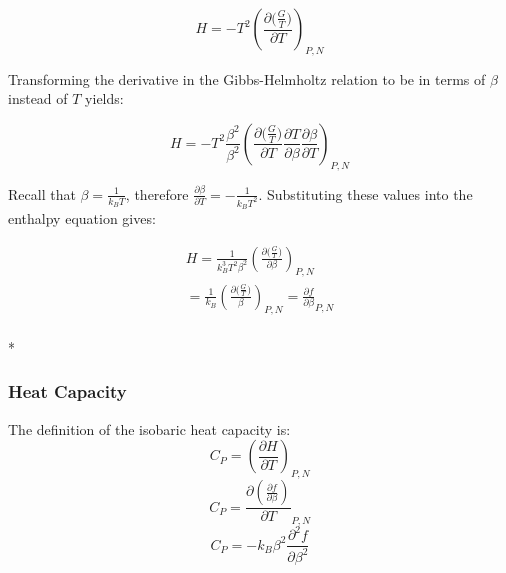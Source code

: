 \documentclass[aps,pre,twocolumn,nofootinbib,superscriptaddress,linenumbers,10pt, draft,tightenlines]{revtex4-1}
\begin{document}
\begin{equation}H=-T^2 \left(\frac{\partial \big(\frac{G}{T}\big)}{\partial T}\right)_{P,N}\end{equation}

Transforming the derivative in the Gibbs-Helmholtz relation to be in terms of $\beta$ instead of $T$ yields:

\begin{equation}H=-T^2  \frac{\beta^2}{\beta^2}\left(\frac{\partial \big(\frac{G}{T}\big)}{\partial T} \frac{\partial T}{\partial \beta} \frac{\partial \beta}{\partial T}\right)_{P,N}\end{equation}


Recall that $\beta = \frac{1}{k_B T}$, therefore $\frac{\partial \beta}{\partial T} = - \frac{1}{k_B T^2}$. Substituting these values into the enthalpy equation gives:

\begin{multline}
H = \frac{1}{k_B^3 T^2 \beta^2} \left(\frac{\partial \big(\frac{G}{T}\big)}{\partial \beta}\right)_{P,N} \\ = \frac{1}{k_B} \left(\frac{\partial \big(\frac{G}{T}\big)}{\beta}\right)_{P,N} = \frac{\partial f}{\partial \beta}_{P,N} 
\end{multline}\\*



\subsubsection{Heat Capacity}
The definition of the isobaric heat capacity is:
\begin{equation}C_P = \left( \frac{\partial H}{\partial T}\right)_{P,N}\end{equation}
\begin{equation}C_P =  \frac{\partial \left(\frac{\partial f}{\partial \beta}\right)}{\partial T}_{P,N}\end{equation}
\begin{equation}C_P = -k_B \beta^2 \frac{\partial^2 f}{\partial \beta^2}\end{equation}
\end{document}
